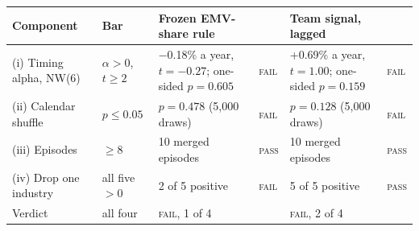 \begin{tabular}{@{}L{0.19\textwidth}L{0.11\textwidth}L{0.27\textwidth}lL{0.27\textwidth}l@{}}
\toprule
Component & Bar & Frozen EMV-share rule & & Team signal, lagged & \\
\midrule
(i) Timing alpha, NW(6) & $\alpha>0$, $t\ge2$ & $-$0.18\% a year, $t=-0.27$; one-sided $p=0.605$ & \textsc{fail} & +0.69\% a year, $t=1.00$; one-sided $p=0.159$ & \textsc{fail} \\
(ii) Calendar shuffle & $p\le0.05$ & $p=0.478$ (5,000 draws) & \textsc{fail} & $p=0.128$ (5,000 draws) & \textsc{fail} \\
(iii) Episodes & $\ge8$ & 10 merged episodes & \textsc{pass} & 10 merged episodes & \textsc{pass} \\
(iv) Drop one industry & all five $>0$ & 2 of 5 positive & \textsc{fail} & 5 of 5 positive & \textsc{pass} \\
\midrule
Verdict & all four & \textsc{fail}, 1 of 4 & & \textsc{fail}, 2 of 4 & \\
\bottomrule
\end{tabular}
